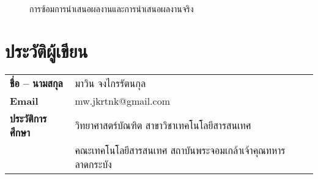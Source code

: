 \begin{figure}[!h]
	\centering
	\caption{การซ้อมการนำเสนอผลงานและการนำเสนอผลงานจริง}
	\label{Fig:present}
\end{figure}

\chapter{ประวัติผู้เขียน}
\begin{tabularx}{\linewidth}{lX}
	\textbf{ชื่อ – นามสกุล} & มาวิน จงไกรรัตนกุล \\
	\textbf{Email} & mw.jkrtnk@gmail.com \\
	\textbf{ประวัติการศึกษา} & วิทยาศาสตร์​บัณฑิต สาขาวิชาเทคโนโลยีสารสนเทศ \\ & คณะเทคโนโลยีสารสนเทศ สถาบันพระจอมเกล้าเจ้าคุณทหารลาดกระบัง \\
\end{tabularx}